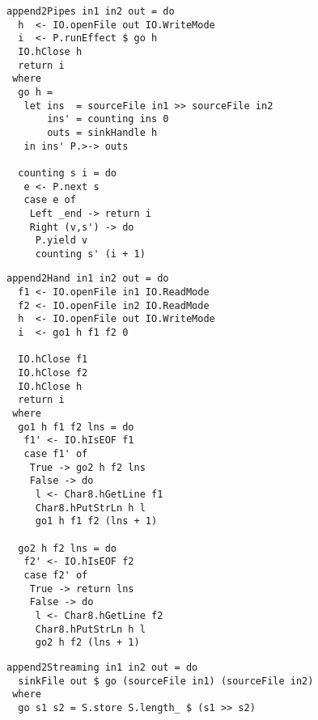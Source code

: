 \begin{lstlisting}[float=ht,label=l:a:bench:append2Pipes,caption=Pipes implementation of \Hs/append2/]
append2Pipes in1 in2 out = do
  h  <- IO.openFile out IO.WriteMode
  i  <- P.runEffect $ go h
  IO.hClose h
  return i
 where
  go h =
   let ins  = sourceFile in1 >> sourceFile in2
       ins' = counting ins 0
       outs = sinkHandle h
   in ins' P.>-> outs 

  counting s i = do
   e <- P.next s
   case e of
    Left _end -> return i
    Right (v,s') -> do
     P.yield v
     counting s' (i + 1)
\end{lstlisting}

\begin{lstlisting}[float=ht,label=l:a:bench:append2Hand,caption=Hand-fused implementation of \Hs/append2/]
append2Hand in1 in2 out = do
  f1 <- IO.openFile in1 IO.ReadMode
  f2 <- IO.openFile in2 IO.ReadMode
  h  <- IO.openFile out IO.WriteMode
  i  <- go1 h f1 f2 0

  IO.hClose f1
  IO.hClose f2
  IO.hClose h
  return i
 where
  go1 h f1 f2 lns = do
   f1' <- IO.hIsEOF f1
   case f1' of
    True -> go2 h f2 lns
    False -> do
     l <- Char8.hGetLine f1
     Char8.hPutStrLn h l
     go1 h f1 f2 (lns + 1)

  go2 h f2 lns = do
   f2' <- IO.hIsEOF f2
   case f2' of
    True -> return lns
    False -> do
     l <- Char8.hGetLine f2
     Char8.hPutStrLn h l
     go2 h f2 (lns + 1)
\end{lstlisting}

\begin{lstlisting}[float=ht,label=l:a:bench:append2Streaming,caption=Streaming implementation of \Hs/append2/]
append2Streaming in1 in2 out = do
  sinkFile out $ go (sourceFile in1) (sourceFile in2)
 where
  go s1 s2 = S.store S.length_ $ (s1 >> s2)
\end{lstlisting}

% 
% 


